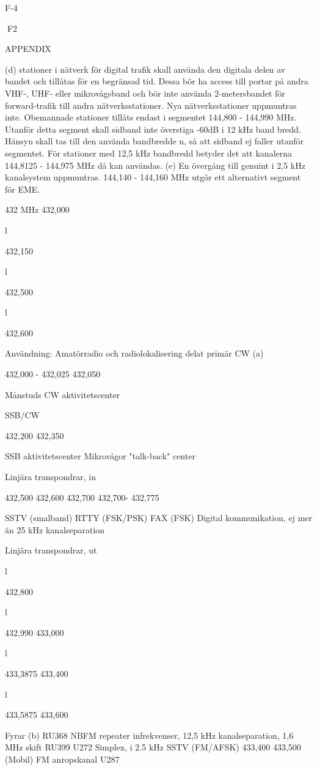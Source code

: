 \documentclass[a4paper,twoside,twocolumn,openright]{book}
\begin{document}
{{{{{{{{{{{F-4

F2

APPENDIX

(d) stationer i nätverk för digital trafik skall använda den digitala delen av bandet och tillåtas för en begränsad tid.
Dessa bör ha access till portar på andra VHF-, UHF- eller mikrovågsband och bör inte använda 2-metersbandet
för forward-trafik till andra nätverksstationer. Nya nätverksstationer uppmuntras inte. Obemannade stationer
tillåts endast i segmentet 144,800 - 144,990 MHz. Utanför detta segment skall sidband inte överstiga -60dB i 12
kHz band bredd. Hänsyn skall tas till den använda bandbredde n, så att sidband ej faller utanför segmentet. För
stationer med 12,5 kHz bandbredd betyder det att kanalerna 144,8125 - 144,975 MHz då kan användas.
(e) En övergång till genuint i 2,5 kHz kanalsystem uppmuntras.
144,140 - 144,160 MHz utgör ett alternativt segment för EME.

432 MHz
432,000

l

432,150

l

432,500

l

432,600

Användning: Amatörradio och radiolokalisering delat primär
CW (a)

432,000 - 432,025
432,050

Månstuds
CW aktivitetscenter

SSB/CW

432,200
432,350

SSB aktivitetscenter
Mikrovågor "talk-back" center

Linjära transpondrar, in

432,500
432,600
432,700
432,700- 432,775

SSTV (smalband)
RTTY (FSK/PSK)
FAX (FSK)
Digital kommunikation, ej mer än
25 kHz kanalseparation

Linjära transpondrar, ut

l

432,800

l

432,990
433,000

l

433,3875
433,400

l

433,5875
433,600

Fyrar (b)
RU368
NBFM repeater infrekvenser, 12,5 kHz kanalseparation, 1,6 MHz skift
RU399
U272
Simplex, i 2.5 kHz
SSTV (FM/AFSK)
433,400
433,500
(Mobil) FM anropskanal
U287

}}}}}}}}}}}
\end{document}

